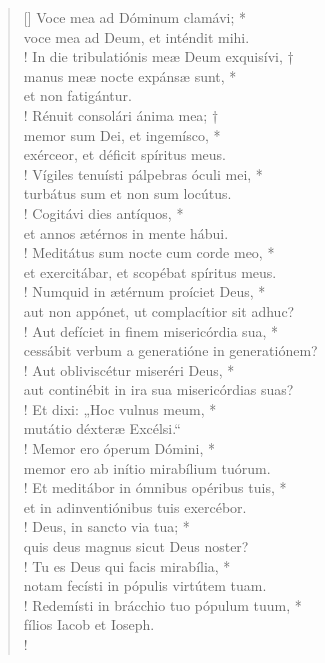 \begin{verse}[\versewidth]
Voce mea ad Dóminum clamávi; *\\
voce mea ad Deum, et inténdit mihi.\\!
\vin In die tribulatiónis meæ Deum exquisívi, †\\
\vin manus meæ nocte expánsæ sunt, *\\
\vin et non fatigántur.\\!
Rénuit consolári ánima mea; †\\
memor sum Dei, et ingemísco, *\\
exérceor, et déficit spíritus meus.\\!
\vin Vígiles tenuísti pálpebras óculi mei, *\\
\vin turbátus sum et non sum locútus.\\!
Cogitávi dies antíquos, *\\
et annos ætérnos in mente hábui.\\!
\vin Meditátus sum nocte cum corde meo, *\\
\vin et exercitábar, et scopébat spíritus meus.\\!
Numquid in ætérnum proíciet Deus, *\\
aut non appónet, ut complacítior sit adhuc?\\!
\vin Aut defíciet in finem misericórdia sua, *\\
\vin cessábit verbum a generatióne in generatiónem?\\!
Aut obliviscétur miseréri Deus, *\\
aut continébit in ira sua misericórdias suas?\\!
\vin Et dixi: „Hoc vulnus meum, *\\
\vin mutátio déxteræ Excélsi.“\\!
Memor ero óperum Dómini, *\\
memor ero ab inítio mirabílium tuórum.\\!
\vin Et meditábor in ómnibus opéribus tuis, *\\
\vin et in adinventiónibus tuis exercébor.\\!
Deus, in sancto via tua; *\\
quis deus magnus sicut Deus noster?\\!
\vin Tu es Deus qui facis mirabília, *\\
\vin notam fecísti in pópulis virtútem tuam.\\!
Redemísti in brácchio tuo pópulum tuum, *\\
fílios Iacob et Ioseph.\\!

\end{verse}
